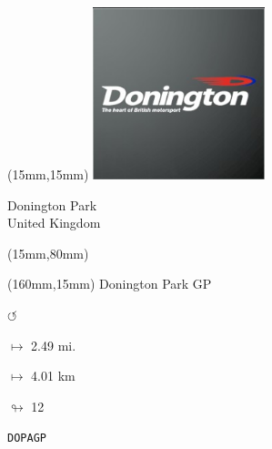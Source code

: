 \begin{textblock*}{50mm}(15mm,15mm)%
\includegraphics[width=50mm]{LG/2015-05-20_00080.png}
\par Donington Park\\ United Kingdom
\end{textblock*}
\begin{textblock*}{185mm}(15mm,80mm)%
\end{textblock*}
\begin{textblock*}{40mm}(160mm,15mm)%
Donington Park GP
\par \Huge$\circlearrowleft$
\Large
\par$\mapsto$ 2.49 mi.
\par$\mapsto$ 4.01 km
\par$\looparrowright$ 12
\par\hfill\tiny\tt DOPAGP\\
\end{textblock*}
\null\newpage

